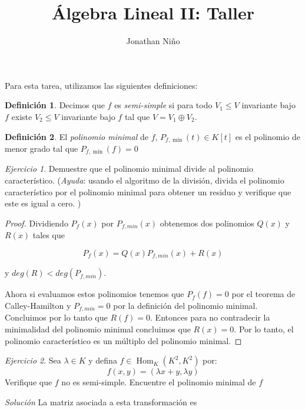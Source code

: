 \documentclass[11pt,a4paper]{article}
\author{Jonathan Niño}
\title{Álgebra Lineal II: Taller}
\theoremstyle{definition}
\newtheorem{defn}{Definición}[section]
\theoremstyle{remark}
\newtheorem{exc}{Ejercicio}
\newcommand{\Hom}{\operatorname{Hom}}
\begin{document}
	\maketitle
	Para esta tarea, utilizamos las siguientes definiciones:
	
	\begin{defn}
		Decimos que $ f $ es \textit{semi-simple} si para todo $ V_1 \leq V $ invariante bajo $ f $ existe $ V_2 \leq V$ invariante bajo $ f $ tal que $ V = V_1 \oplus V_2  $.
	\end{defn}
	
	\begin{defn}
		El \emph{polinomio minimal } de $ f $, $ P_{f, \min}(t) \in K[t] $ es el polinomio de menor grado tal que $ P_{f,\min}(f) = 0 $
	\end{defn}
	
\begin{exc}
	Demuestre que el polinomio minimal divide al polinomio característico. (\textit{Ayuda}: usando el algoritmo de la división, divida el polinomio característico por el polinomio minimal para obtener un residuo y verifique que este es igual a cero. )
\end{exc}
	
\begin{proof}
	Dividiendo $ P_f(x) $ por $ P_{f,min}(x) $ obtenemos dos polinomios $ Q(x) $ y $ R(x) $ tales que 
	
	\begin{equation}
	P_f(x)=Q(x)P_{f,min}(x)+R(x) \nonumber
	\end{equation} 
	
	y $ deg(R)<deg(P_{f,min}) $.
	
	Ahora si evaluamos estos polinomios tenemos que $ P_f(f)=0 $ por el teorema de Calley-Hamilton y $ P_{f,min}=0 $ por la definición del polinomio minimal. Concluimos por lo tanto que $ R(f)=0 $. Entonces para no contradecir la minimalidad del polinomio minimal concluimos que $ R(x)=0 $. Por lo tanto, el polinomio característico es un múltiplo del polinomio minimal.
\end{proof}	
	
\begin{exc}
	Sea $ \lambda \in K $ y defina $ f \in \Hom_K(K^2,K^2) $ por:
	\[ f(x,y) = (\lambda x + y, \lambda y) \]
	Verifique que $ f $ no es semi-simple. Encuentre el polinomio minimal de $ f $
\end{exc}	

\textit{Solución}
La matriz asociada a esta transformación es
\end{document}
